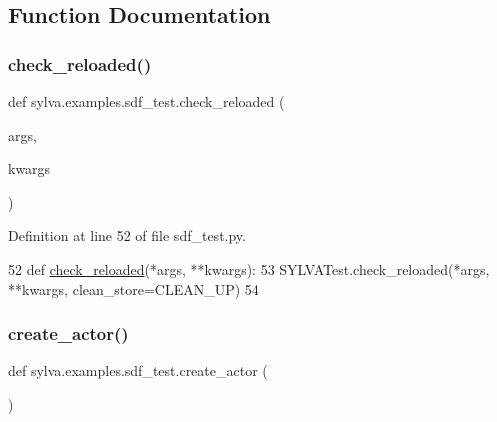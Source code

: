 \subsection{Function Documentation}
\mbox{\label{namespacesylva_1_1examples_1_1sdf__test_aa26a40c94584da30c0ad626c2186425e}} 
\subsubsection{\texorpdfstring{check\+\_\+reloaded()}{check\_reloaded()}}
{\footnotesize\ttfamily def sylva.\+examples.\+sdf\+\_\+test.\+check\+\_\+reloaded (\begin{DoxyParamCaption}\item[{}]{args,  }\item[{}]{kwargs }\end{DoxyParamCaption})}



Definition at line 52 of file sdf\+\_\+test.\+py.


\begin{DoxyCode}
52     \textcolor{keyword}{def }\hyperlink{namespacesylva_1_1examples_1_1sdf__test_aa26a40c94584da30c0ad626c2186425e}{check\_reloaded}(*args, **kwargs):
53         SYLVATest.check\_reloaded(*args, **kwargs, clean\_store=CLEAN\_UP)
54 
\end{DoxyCode}
\mbox{\label{namespacesylva_1_1examples_1_1sdf__test_a76589ddbcc30881033648fc0cf368f7e}} 
\subsubsection{\texorpdfstring{create\+\_\+actor()}{create\_actor()}}
{\footnotesize\ttfamily def sylva.\+examples.\+sdf\+\_\+test.\+create\+\_\+actor (\begin{DoxyParamCaption}{ }\end{DoxyParamCaption})}



